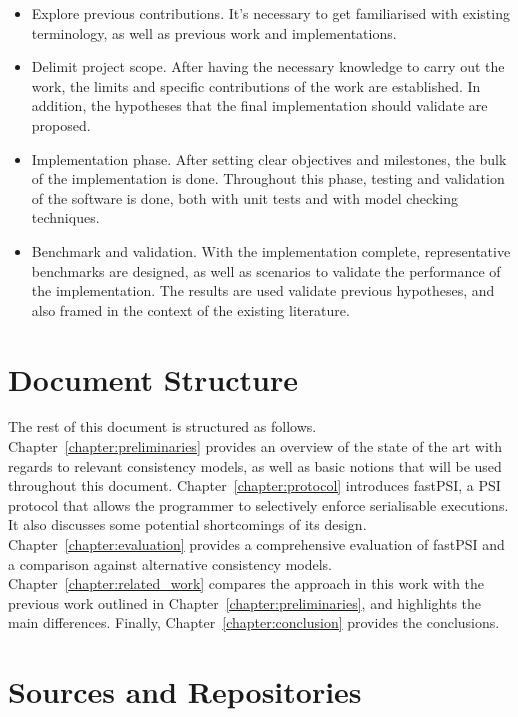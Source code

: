 \begin{itemize}
    \item Explore previous contributions. It's necessary to get familiarised with existing terminology, as well as previous work and implementations.

    \item Delimit project scope. After having the necessary knowledge to carry out the work, the limits and specific contributions of the work are established. In addition, the hypotheses that the final implementation should validate are proposed.

    \item Implementation phase. After setting clear objectives and milestones, the bulk of the implementation is done. Throughout this phase, testing and validation of the software is done, both with unit tests and with model checking techniques.

    \item Benchmark and validation. With the implementation complete, representative benchmarks are designed, as well as scenarios to validate the performance of the implementation. The results are used validate previous hypotheses, and also framed in the context of the existing literature.
\end{itemize}

\section{Document Structure}

The rest of this document is structured as follows. Chapter~\ref{chapter:preliminaries} provides an overview of the state of the art with regards to relevant consistency models, as well as basic notions that will be used throughout this document. Chapter~\ref{chapter:protocol} introduces fastPSI, a PSI protocol that allows the programmer to selectively enforce serialisable executions. It also discusses some potential shortcomings of its design. Chapter~\ref{chapter:evaluation} provides a comprehensive evaluation of fastPSI and a comparison against alternative consistency models. Chapter~\ref{chapter:related_work} compares the approach in this work with the previous work outlined in Chapter~\ref{chapter:preliminaries}, and highlights the main differences. Finally, Chapter~\ref{chapter:conclusion} provides the conclusions.

\section{Sources and Repositories}


